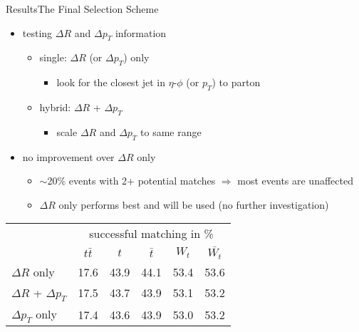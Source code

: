 \documentclass[9pt, aspectratio=169]{beamer}
\begin{document}
\begin{frame}{Results}{The Final Selection Scheme}
	\begin{itemize}
    	\item testing $\Delta R$ and $\Delta p_T$ information %
    	\begin{itemize}
			\item single: $\Delta R$ (or $\Delta p_T$) only
			\begin{itemize}
		  		\item look for the closest jet in $\eta$-$\phi$ (or $p_T$) to parton
			\end{itemize}
			\item hybrid: $\Delta R$ + $\Delta p_T$
			\begin{itemize}
				\item scale $\Delta R$ and $\Delta p_T$ to same range
			\end{itemize}
		\end{itemize}
    	\item no improvement over $\Delta R$ only
    	\begin{itemize}
      		\item $\sim$20\% events with 2+ potential matches $\Rightarrow$ most events are unaffected
			\item $\Delta R$ only performs best and will be used (no further investigation)
    	\end{itemize}
	\end{itemize}

	\begin{table}
		\centering
		\begin{tabular}{l|c|c|c|c|c|}
			&\multicolumn{5}{c|}{successful matching in \%}\\
			& $t\bar{t}$ & $t$ & $\bar{t}$ & $W_t$ & $\bar{W_t}$\\
			\hline
			\rowcolor{highlighter!40}
			$\Delta R$ only & 17.6 & 43.9 & 44.1 & 53.4 & 53.6\\
			$\Delta R$ + $\Delta p_T$ & 17.5 & 43.7 & 43.9 & 53.1 & 53.2\\
			$\Delta p_T$ only & 17.4 & 43.6 & 43.9 & 53.0 & 53.2\\
		\end{tabular}
	\end{table}
\end{frame}
\end{document}

